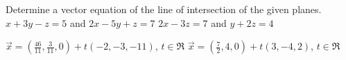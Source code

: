 
\begin{Exercise}[
name={},
title={}, 
difficulty=0,
origin={\cite{SM}}]
Determine a vector equation of the line of intersection of the given planes.
\Question $x+3y-z=5$ and $2x-5y+z=7$
\Question $2x-3z=7$ and $y+2z=4$
\end{Exercise}

\begin{Answer}
\Question $\vec{x}=\left(\frac{46}{11},\frac{3}{11},0\right)+t(-2,-3,-11)$, $t\in\Re$
\Question $\vec{x}=\left(\frac{7}{2},4,0\right)+t(3,-4,2)$, $t\in\Re$
\end{Answer}
